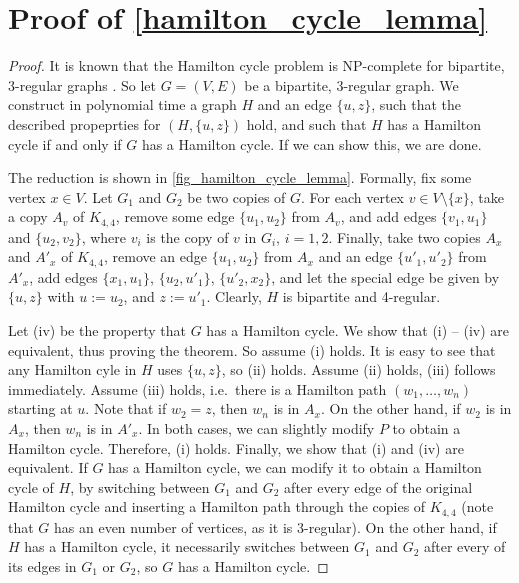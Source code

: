 \documentclass[runningheads]{llncs}
\numberwithin{equation}{section}
\newcommand{\set}[1]{\{ #1 \}}
\begin{document}
\section{Proof of \cref{hamilton_cycle_lemma}}

\label{appendix:hamilton_prime}
\hamiltonPrime*

\begin{proof}
It is known that the Hamilton cycle problem is NP-complete for bipartite, 3-regular graphs \cite{hamilton3regularBip}. So let $G = (V, E)$ be a bipartite, 3-regular graph. We construct in polynomial time a graph $H$ and an edge $\set{u,z}$, such that the described propeprties for $(H, \set{u,z})$ hold, and such that $H$ has a Hamilton cycle if and only if $G$ has a Hamilton cycle. If we can show this, we are done.

The reduction is shown in \cref{fig_hamilton_cycle_lemma}. Formally, fix some vertex $x \in V$. Let $G_1$ and $G_2$ be two copies of $G$. For each vertex $v \in V \setminus \set{x}$, take a copy $A_v$ of $K_{4,4}$, remove some edge $\set{u_1, u_2}$ from $A_v$, and add edges $\set{v_1,u_1}$ and $\set{u_2,v_2}$, where $v_i$ is the copy of $v$ in $G_i$, $i = 1,2$. Finally, take two copies $A_x$ and $A'_x$ of $K_{4,4}$, remove an edge $\set{u_1,u_2}$ from $A_x$ and an edge $\set{u'_1,u'_2}$ from $A'_x$, add edges $\set{x_1,u_1}$, $\set{u_2,u'_1}$, $\set{u'_2,x_2}$, and let the special edge be given by $\set{u, z}$ with $u := u_2$, and $z := u'_1$. Clearly, $H$ is bipartite and 4-regular.

Let (iv) be the property that $G$ has a Hamilton cycle. We show that (i) -- (iv) are equivalent, thus proving the theorem. So assume (i) holds. It is easy to see that any Hamilton cyle in $H$ uses $\set{u,z}$, so (ii) holds. Assume (ii) holds, (iii) follows immediately. Assume (iii) holds, i.e.\ there is a Hamilton path $(w_1, \dots, w_n)$ starting at $u$. Note that if $w_2 = z$, then $w_n$ is in $A_x$. On the other hand, if $w_2$ is in $A_x$, then $w_n$ is in $A'_x$. In both cases, we can slightly modify $P$ to obtain a Hamilton cycle. Therefore, (i) holds. Finally, we show that (i) and (iv) are equivalent. If $G$ has a Hamilton cycle, we can modify it to obtain a Hamilton cycle of $H$, by switching between $G_1$ and $G_2$ after every edge of the original Hamilton cycle and inserting a Hamilton path through the copies of $K_{4,4}$ (note that $G$ has an even number of vertices, as it is 3-regular). On the other hand, if $H$ has a Hamilton cycle, it necessarily switches between $G_1$ and $G_2$ after every of its edges in $G_1$ or $G_2$, so $G$ has a Hamilton cycle.
\end{proof}
\end{document}
